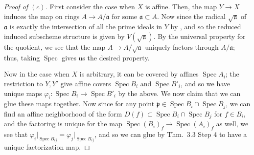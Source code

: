 \documentclass[12pt,letterpaper]{article}
\theoremstyle{definition}
\theoremstyle{remark}
\numberwithin{equation}{section}
\numberwithin{figure}{problem}
\DeclareMathOperator{\Spec}{Spec}
\begin{document}
\begin{proof}[Proof of $(c)$]
  First consider the case when $X$ is affine. Then, the map $Y \to X$ induces the map on rings $A \to A/\mathfrak{a}$ for some $\mathfrak{a} \subset A$. Now since the radical $\sqrt{\mathfrak{a}}$ of $\mathfrak{a}$ is exactly the intersection of all the prime ideals in $Y$ by \cite[Prop.~1.14]{AM69}, and so the reduced induced subscheme structure is given by $V(\sqrt{\mathfrak{a}})$. By the universal property for the quotient, we see that the map $A \to A/\sqrt{\mathfrak{a}}$ uniquely factors through $A/\mathfrak{a}$; thus, taking $\Spec$ gives us the desired property.
  \par Now in the case when $X$ is arbitrary, it can be covered by affines $\Spec A_i$; the restriction to $Y,Y'$ give affine covers $\Spec B_i$ and $\Spec B'_i$, and so we have unique maps $\varphi_i\colon\Spec B_i \to \Spec B'_i$ by the above. We now claim that we can glue these maps together. Now since for any point $\mathfrak{p} \in \Spec B_i \cap \Spec B_j$, we can find an affine neighborhood of the form $D(f) \subset \Spec B_i \cap \Spec B_j$ for $f \in B_i$, and the factoring is unique for the map $\Spec (B_i)_f \to \Spec(A_i)_f$ as well, we see that $\varphi_i\vert_{\Spec B_{ij}} = \varphi_j\vert_{\Spec B_{ij}}$, and so we can glue by Thm.~3.3 Step 4 to have a unique factorization map.
\end{proof}
\end{document}

